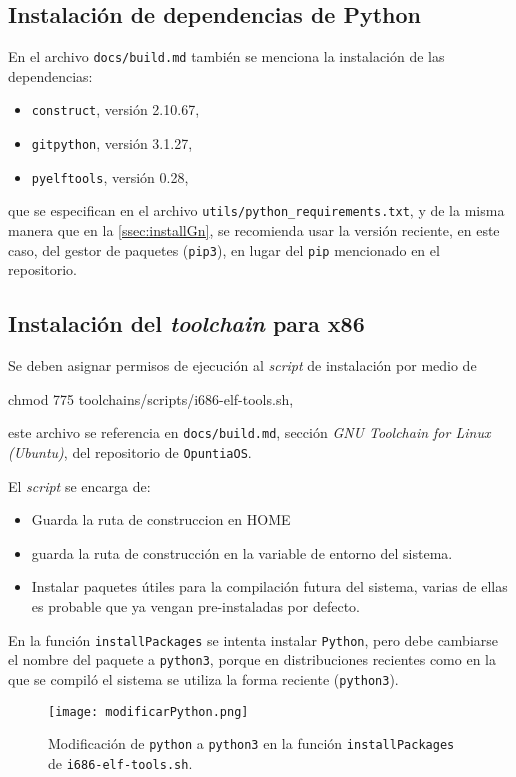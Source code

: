 \subsection{Instalación de dependencias de Python}
	En el archivo \texttt{docs/build.md} también se menciona la instalación de
	las dependencias:
	\begin{itemize} \setlength\itemsep{0pt}
		\item \texttt{construct}, versión 2.10.67,
		\item \texttt{gitpython}, versión 3.1.27,
		\item \texttt{pyelftools}, versión 0.28,
	\end{itemize}
	
	
	
	que se especifican en el archivo 
	\texttt{utils/python\_requirements.txt},
	y de la misma manera que en la \autoref{ssec:installGn}, se recomienda usar la versión reciente, en este caso, del gestor de paquetes (\texttt{pip3}), en lugar del \texttt{pip} mencionado en el repositorio.
	
	
\newpage
\subsection{Instalación del \textit{toolchain} para x86}
	Se deben asignar permisos de ejecución al \textit{script} de instalación por medio de 
	\begin{center}
		\ttfamily
		chmod 775 toolchains/scripts/i686-elf-tools.sh,
	\end{center}

	este archivo se referencia en \texttt{docs/build.md}, sección \textit{GNU Toolchain for Linux (Ubuntu)}, del repositorio de \texttt{OpuntiaOS}.
	
	
	
	El \textit{script} se encarga de:
	\begin{itemize} \setlength\itemsep{0pt}
		\item Guarda la ruta de construccion en HOME
		\item guarda la ruta de construcción en la variable de entorno del sistema.
		\item Instalar paquetes útiles para la compilación futura del sistema, varias de ellas es probable que ya vengan pre-instaladas por defecto.
		
	\end{itemize}

	En la función \texttt{installPackages} se intenta instalar \texttt{Python}, pero debe cambiarse el nombre del paquete a \texttt{python3}, porque en distribuciones recientes como en la que se compiló el sistema se utiliza la forma reciente (\texttt{python3}).
	\begin{figure}[ht]
		\centering
		\texttt{[image: modificarPython.png]}
		\caption{
			Modificación de \texttt{python} a \texttt{python3} en la función \texttt{installPackages} de \texttt{i686-elf-tools.sh}.
			\label{fig:modificarPython}
		}
	\end{figure}

